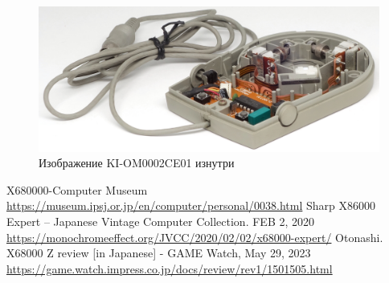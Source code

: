 \documentclass[11pt, a4paper]{article}
\begin{document}
\begin{figure}[h]
    \centering
    \includegraphics[scale=0.8]{1987_sharp_convertible/inside_30.jpg}
    \caption{Изображение KI-OM0002CE01 изнутри}
    \label{fig:SharpConvertibleInside}
\end{figure}

\begin{thebibliography}{9}
 X680000-Computer Museum \url{https://museum.ipsj.or.jp/en/computer/personal/0038.html}
 Sharp X86000 Expert -- Japanese Vintage Computer Collection. FEB 2, 2020 \url{https://monochromeeffect.org/JVCC/2020/02/02/x68000-expert/}
 Otonashi. X68000 Z review [in Japanese] - GAME Watch, May 29, 2023 \url{https://game.watch.impress.co.jp/docs/review/rev1/1501505.html}
\end{thebibliography}
\end{document}
